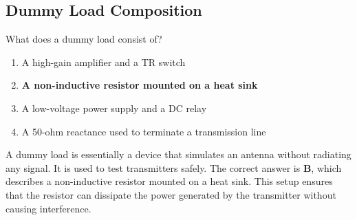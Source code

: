 \subsection{Dummy Load Composition}
\label{T7C03}

\begin{tcolorbox}[colback=gray!10!white,colframe=black!75!black,title=T7C03]
What does a dummy load consist of?
\begin{enumerate}[noitemsep]
    \item A high-gain amplifier and a TR switch
    \item \textbf{A non-inductive resistor mounted on a heat sink}
    \item A low-voltage power supply and a DC relay
    \item A 50-ohm reactance used to terminate a transmission line
\end{enumerate}
\end{tcolorbox}

A dummy load is essentially a device that simulates an antenna without radiating any signal. It is used to test transmitters safely. The correct answer is \textbf{B}, which describes a non-inductive resistor mounted on a heat sink. This setup ensures that the resistor can dissipate the power generated by the transmitter without causing interference.